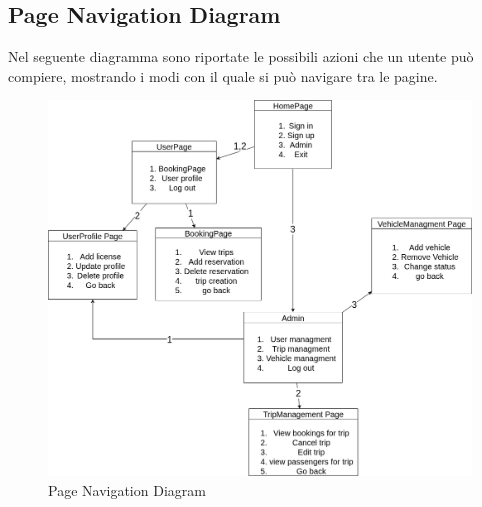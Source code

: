\subsection{Page Navigation Diagram}\label{subsec:PageNavigation}
Nel seguente diagramma sono riportate le possibili azioni che un utente può compiere, mostrando i modi con il quale si può navigare tra le pagine.
\begin{figure}[H]
    \centering
    \includegraphics[width = 1.25\linewidth]{Images/PageNavigation_diag.png}
    \caption{Page Navigation Diagram}
    \label{fig:PageNavdiag}
\end{figure}
